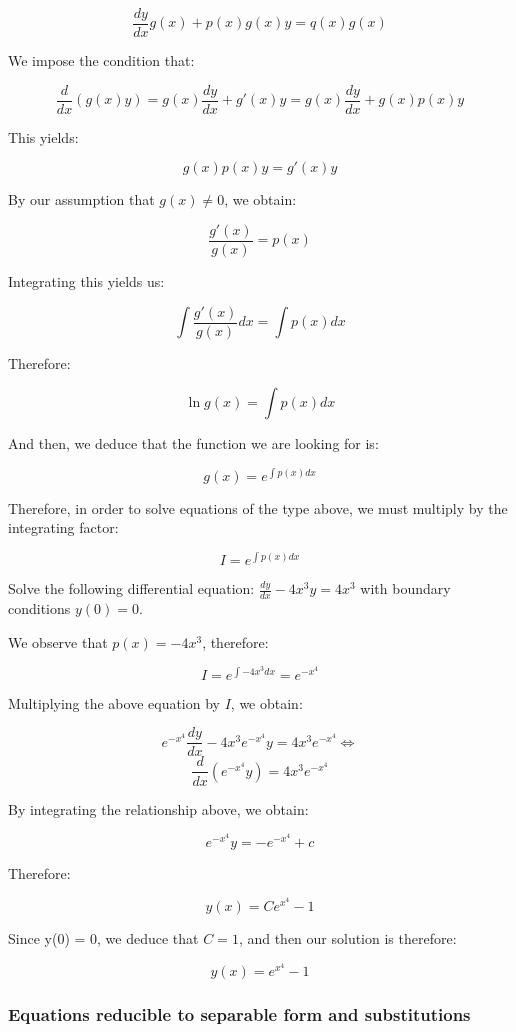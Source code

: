 \documentclass[12pt]{article}
\begin{document}
\[ \frac{dy}{dx}g(x) + p(x)g(x)y = q(x)g(x) \]

We impose the condition that:

\[ \frac{d}{dx}(g(x)y) = g(x)\frac{dy}{dx} + g'(x)y = g(x)\frac{dy}{dx} + g(x)p(x)y \]

This yields:

\[ g(x)p(x)y = g'(x)y \]

By our assumption that $g(x) \neq 0$, we obtain:

\[ \frac{g'(x)}{g(x)} = p(x) \]

Integrating this yields us:

\[ \int \frac{g'(x)}{g(x)}dx = \int p(x)dx \]

Therefore:

\[ \ln{g(x)} = \int p(x)dx \]

And then, we deduce that the function we are looking for is:

\[ g(x) = e^{\int p(x)dx} \]

Therefore, in order to solve equations of the type above, we must multiply by the integrating factor:

\[ I = e^{\int p(x)dx} \]

\begin{example}
    Solve the following differential equation: $\frac{dy}{dx} - 4x^3y = 4x^3$ with boundary conditions $y(0) = 0$.

    We observe that $p(x) = -4x^3$, therefore:

    \[ I = e^{\int -4x^3dx} = e^{-x^4} \]

    Multiplying the above equation by $I$, we obtain:

    \[ e^{-x^4}\frac{dy}{dx} - 4x^3e^{-x^4}y = 4x^3e^{-x^4} \Leftrightarrow \]
    \[ \frac{d}{dx}(e^{-x^4}y) = 4x^3e^{-x^4} \]

    By integrating the relationship above, we obtain:

    \[ e^{-x^4}y = -e^{-x^4} + c \]

    Therefore:

    \[ y(x) = Ce^{x^4} - 1 \]

    Since y(0) = 0, we deduce that $C = 1$, and then our solution is therefore:

    \[ y(x) = e^{x^4} - 1 \]
\end{example}

\subsubsection{Equations reducible to separable form and substitutions}
\end{document}
